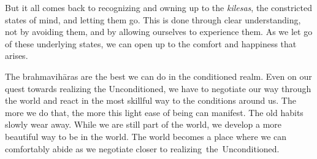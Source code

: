 But it all comes back to recognizing and owning up to the \emph{kilesas}, the constricted states of mind, and letting them go. This is done through clear understanding, not by avoiding them, and by allowing ourselves to experience them. As we let go of these underlying states, we can open up to the comfort and happiness that arises.

\enlargethispage{1\baselineskip}
The brahmavihāras are the best we can do in the conditioned realm. Even on our quest towards realizing the Unconditioned, we have to negotiate our way through the world and react in the most skillful way to the conditions around us. The more we do that, the more this light ease of being can manifest. The old habits slowly wear away. While we are still part of the world, we develop a more beautiful way to be in the world. The world becomes a place where we can comfortably abide as we negotiate closer to \mbox{realizing the Unconditioned.}
